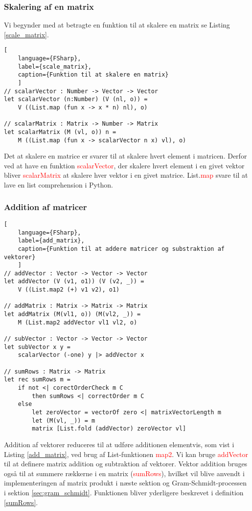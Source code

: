 \subsubsection{Skalering af en matrix}
Vi begynder med at betragte en funktion til at skalere en matrix se Listing \ref{scale_matrix}. 

\begin{lstlisting}[
    language={FSharp}, 
    label={scale_matrix}, 
    caption={Funktion til at skalere en matrix}
    ]
// scalarVector : Number -> Vector -> Vector
let scalarVector (n:Number) (V (nl, o)) = 
    V ((List.map (fun x -> x * n) nl), o)

// scalarMatrix : Matrix -> Number -> Matrix
let scalarMatrix (M (vl, o)) n = 
    M ((List.map (fun x -> scalarVector n x) vl), o)
\end{lstlisting}

Det at skalere en matrice er svarer til at skalere hvert element i matricen. Derfor ved at have en funktion \textcolor{red}{scalarVector}, der skalere hvert element i en givet vektor bliver \textcolor{red}{scalarMatrix} at skalere hver vektor i en givet matrice. List.\textcolor{red}{map} svare til at lave en list comprehension i Python.


\subsubsection{Addition af matricer}
\begin{lstlisting}[
    language={FSharp}, 
    label={add_matrix}, 
    caption={Funktion til at addere matricer og substraktion af vektorer}
    ]
// addVector : Vector -> Vector -> Vector
let addVector (V (v1, o1)) (V (v2, _)) =
    V ((List.map2 (+) v1 v2), o1)

// addMatrix : Matrix -> Matrix -> Matrix
let addMatrix (M(vl1, o)) (M(vl2, _)) =
    M (List.map2 addVector vl1 vl2, o)

// subVector : Vector -> Vector -> Vector
let subVector x y =
    scalarVector (-one) y |> addVector x
    
// sumRows : Matrix -> Matrix
let rec sumRows m = 
    if not <| corectOrderCheck m C 
        then sumRows <| correctOrder m C
    else
        let zeroVector = vectorOf zero <| matrixVectorLength m
        let (M(vl, _)) = m
        matrix [List.fold (addVector) zeroVector vl]
\end{lstlisting}

Addition af vektorer reduceres til at udføre additionen elementvis, som vist i Listing \ref{add_matrix}, ved brug af List-funktionen \textcolor{red}{map2}. Vi kan bruge \textcolor{red}{addVector} til at definere matrix addition og subtraktion af vektorer. Vektor addition bruges også til at summere rækkerne i en matrix (\textcolor{red}{sumRows}), hvilket vil blive anvendt i implementeringen af matrix produkt i næste sektion og Gram-Schmidt-processen i sektion \ref{sec:gram_schmidt}. Funktionen bliver yderligere beskrevet i definition \ref{sumRows}.

